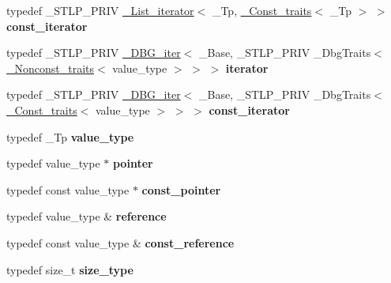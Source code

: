 \begin{DoxyCompactItemize}
typedef \+\_\+\+S\+T\+L\+P\+\_\+\+P\+R\+IV \hyperlink{struct___list__iterator}{\+\_\+\+List\+\_\+iterator}$<$ \+\_\+\+Tp, \hyperlink{struct___const__traits}{\+\_\+\+Const\+\_\+traits}$<$ \+\_\+\+Tp $>$ $>$ {\bfseries const\+\_\+iterator}
\item 
\mbox{\label{classlist_a4d0276f77b06c06a705f7754d2c2dff5}} 
typedef \+\_\+\+S\+T\+L\+P\+\_\+\+P\+R\+IV \hyperlink{struct___d_b_g__iter}{\+\_\+\+D\+B\+G\+\_\+iter}$<$ \+\_\+\+Base, \+\_\+\+S\+T\+L\+P\+\_\+\+P\+R\+IV \+\_\+\+Dbg\+Traits$<$ \hyperlink{struct___nonconst__traits}{\+\_\+\+Nonconst\+\_\+traits}$<$ value\+\_\+type $>$ $>$ $>$ {\bfseries iterator}
\item 
\mbox{\label{classlist_a983adb1f6967238db63f4e220e44d107}} 
typedef \+\_\+\+S\+T\+L\+P\+\_\+\+P\+R\+IV \hyperlink{struct___d_b_g__iter}{\+\_\+\+D\+B\+G\+\_\+iter}$<$ \+\_\+\+Base, \+\_\+\+S\+T\+L\+P\+\_\+\+P\+R\+IV \+\_\+\+Dbg\+Traits$<$ \hyperlink{struct___const__traits}{\+\_\+\+Const\+\_\+traits}$<$ value\+\_\+type $>$ $>$ $>$ {\bfseries const\+\_\+iterator}
\item 
\mbox{\label{classlist_a74c9b1e6ea3b820c1c32d718e8bc70ac}} 
typedef \+\_\+\+Tp {\bfseries value\+\_\+type}
\item 
\mbox{\label{classlist_a460e9c7d616908ad65f0c42909a95d85}} 
typedef value\+\_\+type $\ast$ {\bfseries pointer}
\item 
\mbox{\label{classlist_a3691045d29bcde2f0308c88ee70e86c5}} 
typedef const value\+\_\+type $\ast$ {\bfseries const\+\_\+pointer}
\item 
\mbox{\label{classlist_a27d0b8de8a8846627b274911bc4d79d7}} 
typedef value\+\_\+type \& {\bfseries reference}
\item 
\mbox{\label{classlist_a86a37db3fffb22139853d84fb93dde08}} 
typedef const value\+\_\+type \& {\bfseries const\+\_\+reference}
\item 
\mbox{\label{classlist_aa581b63010a0b205cf48992c5e5cce35}} 
typedef size\+\_\+t {\bfseries size\+\_\+type}
\item 
\mbox{\label{classlist_ab28cb156d10d481c0dc22af5ee7ed9ad}} 

\end{DoxyCompactItemize}
